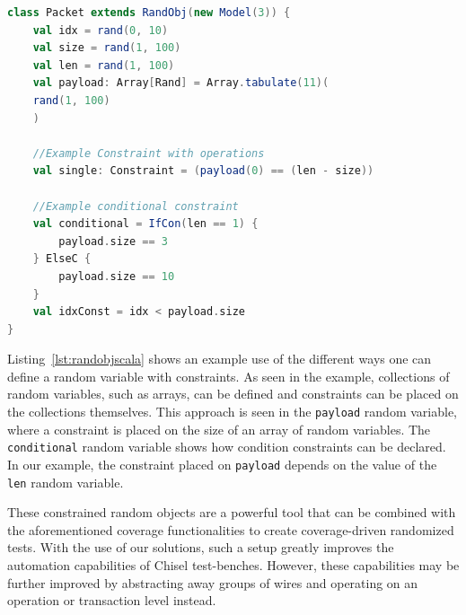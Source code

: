 \documentclass[conference]{IEEEtran}
\begin{document}
\begin{lstlisting}[language=scala, caption={Example usage of a random object. \texttt{rand(min, max, type=Normal)} declares a random variable. Any operation on a random variable generates a constraint.}, label={lst:randobjscala}]    
class Packet extends RandObj(new Model(3)) {
    val idx = rand(0, 10)
    val size = rand(1, 100)
    val len = rand(1, 100)
    val payload: Array[Rand] = Array.tabulate(11)(
 	rand(1, 100)
    )

    //Example Constraint with operations
    val single: Constraint = (payload(0) == (len - size))
	
    //Example conditional constraint
    val conditional = IfCon(len == 1) {
        payload.size == 3
    } ElseC {
        payload.size == 10
    }
    val idxConst = idx < payload.size
}
\end{lstlisting}

Listing~\ref{lst:randobjscala} shows an example use of the different ways one can define a random variable with constraints.
As seen in the example, collections of random variables, such as arrays, can be defined and constraints can be placed on the collections themselves.
This approach is seen in the \texttt{payload} random variable, where a constraint is placed on the size of an array of random variables.
The \texttt{conditional} random variable shows how condition constraints can be declared.
In our example, the constraint placed on \texttt{payload} depends on the value of the \texttt{len} random variable. 

These constrained random objects are a powerful tool that can be combined with the aforementioned coverage functionalities to create coverage-driven randomized tests.
With the use of our solutions, such a setup greatly improves the automation capabilities of Chisel test-benches.
However, these capabilities may be further improved by abstracting away groups of wires and operating on an operation or transaction level instead.


\end{document}
